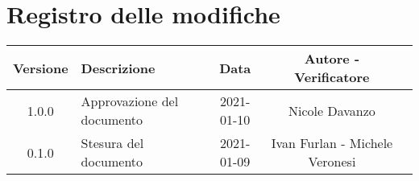 \section*{Registro delle modifiche}

\begin{center}
	\begin{longtable}{|c|p{5cm}|c|c|c|}
		\hline
		\rowcolor{lighter-grayer}
		\textbf{Versione} & \textbf{Descrizione} & \textbf{Data} & \textbf{Autore - Verificatore} \\
		\hline
		\endfirsthead


		\hline
		1.0.0 & Approvazione del documento & 2021-01-10 & Nicole Davanzo\\
		0.1.0 & Stesura del documento & 2021-01-09 & Ivan Furlan - Michele Veronesi \\
		\hline
	\end{longtable}
\end{center}